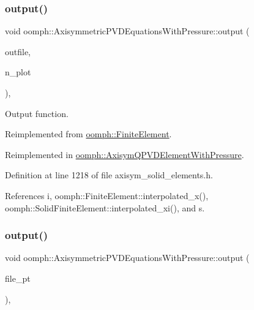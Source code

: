 \subsubsection{\texorpdfstring{output()}{output()}\hspace{0.1cm}{\footnotesize\ttfamily [2/4]}}
{\footnotesize\ttfamily void oomph\+::\+Axisymmetric\+P\+V\+D\+Equations\+With\+Pressure\+::output (\begin{DoxyParamCaption}\item[{std\+::ostream \&}]{outfile,  }\item[{const unsigned \&}]{n\+\_\+plot }\end{DoxyParamCaption})\hspace{0.3cm}{\ttfamily [inline]}, {\ttfamily [virtual]}}



Output function. 



Reimplemented from \hyperlink{classoomph_1_1FiniteElement_afa9d9b2670f999b43e6679c9dd28c457}{oomph\+::\+Finite\+Element}.



Reimplemented in \hyperlink{classoomph_1_1AxisymQPVDElementWithPressure_aa7bf745c0767590c36a761d3a6399e57}{oomph\+::\+Axisym\+Q\+P\+V\+D\+Element\+With\+Pressure}.



Definition at line 1218 of file axisym\+\_\+solid\+\_\+elements.\+h.



References i, oomph\+::\+Finite\+Element\+::interpolated\+\_\+x(), oomph\+::\+Solid\+Finite\+Element\+::interpolated\+\_\+xi(), and s.

\mbox{\label{classoomph_1_1AxisymmetricPVDEquationsWithPressure_ad5018c9a6f9236f13c6df43df87336aa}} 
\subsubsection{\texorpdfstring{output()}{output()}\hspace{0.1cm}{\footnotesize\ttfamily [3/4]}}
{\footnotesize\ttfamily void oomph\+::\+Axisymmetric\+P\+V\+D\+Equations\+With\+Pressure\+::output (\begin{DoxyParamCaption}\item[{F\+I\+LE $\ast$}]{file\+\_\+pt }\end{DoxyParamCaption})\hspace{0.3cm}{\ttfamily [inline]}, {\ttfamily [virtual]}}




